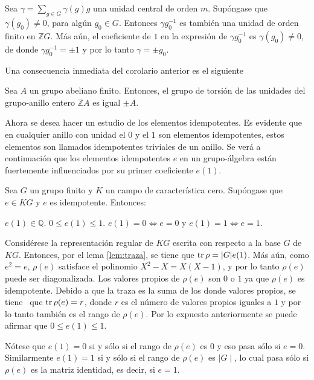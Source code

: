 \begin{proof*}
Sea $\gamma = \sum_{g \in G}\gamma(g)g$ una unidad central de orden $m$. Supóngase que $\gamma(g_0) \neq 0$, para algún $g_0 \in G$. Entonces $\gamma g_0^{-1}$ es también una unidad de orden finito en $\mathds{Z}G$. Más aún, el coeficiente de $1$ en la expresión de $\gamma g_0^{-1}$ es $\gamma(g_0) \neq 0$, de donde $\gamma g_0^{-1} = \pm 1$ y por lo tanto $\gamma = \pm g_0$.
\end{proof*}
Una consecuencia inmediata del corolario anterior es el siguiente
\begin{teorema}\label{teo:Graham-Higman}
Sea $A$ un grupo abeliano finito. Entonces, el grupo de torsión de las unidades del grupo-anillo entero $\mathds{Z}A$ es igual $\pm A$.
\end{teorema}

Ahora se desea hacer un estudio de los elementos idempotentes. Es evidente que en cualquier anillo con unidad el $0$ y el $1$ son elementos idempotentes, estos elementos son llamados idempotentes triviales de un anillo. Se verá a continuación que los elementos idempotentes $e$ en un grupo-álgebra están fuertemente influenciados por su primer coeficiente $e(1)$.

\begin{teorema}\label{teo:idme}
Sea $G$ un grupo finito y $K$ un campo de característica cero. Supóngase que $e \in KG$ y $e$ es idempotente. Entonces:
\begin{bulletList}
\newItem $e(1) \in \mathds{Q}$.
\newItem $0 \leq e(1) \leq 1$.
\newItem $e(1) = 0 \Leftrightarrow e = 0$ y $e(1) = 1 \Leftrightarrow e=1$.   
\end{bulletList} 
\end{teorema}
\begin{proof*}
Considérese la representación regular de $KG$ escrita con respecto a la base $G$ de $KG$. Entonces, por el lema \ref{lem:traza}, se tiene que $\operatorname{tr}\rho = |G| e(1)$. Más aún, como $e^2 = e$, $\rho(e)$ satisface el polinomio $X^2 - X = X(X-1)$, y por lo tanto $\rho(e)$ puede ser diagonalizada. Los valores propios de $\rho(e)$ son $0$ o $1$ ya que $\rho(e)$ es idempotente. Debido a que la traza es la suma de los donde valores propios, se tiene \ que  $\operatorname{tr}\rho(e) = r$,  donde  $r$  es el número de valores propios iguales a $1$ y por lo tanto también es el  rango de $\rho(e)$. Por lo expuesto anteriormente se puede afirmar que $0\leq e(1) \leq 1$.

Nótese que $e(1) = 0 $ si y sólo si el rango de $\rho(e)$ es $0$ y eso pasa sólo si $e = 0$. Similarmente $e(1) = 1$ si y sólo si el rango de $\rho(e)$ es $\mid G \mid $, lo cual pasa sólo si $\rho(e)$ es la matriz identidad, es decir, si $e = 1$. 
\end{proof*} 
